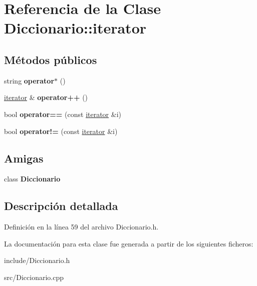 \hypertarget{classDiccionario_1_1iterator}{}\section{Referencia de la Clase Diccionario\+:\+:iterator}
\label{classDiccionario_1_1iterator}
\subsection*{Métodos públicos}
\begin{DoxyCompactItemize}
\item 
string {\bfseries operator$\ast$} ()\hypertarget{classDiccionario_1_1iterator_aa03a8aa59bb2b36d4b6d6540afc18deb}{}\label{classDiccionario_1_1iterator_aa03a8aa59bb2b36d4b6d6540afc18deb}

\item 
\hyperlink{classDiccionario_1_1iterator}{iterator} \& {\bfseries operator++} ()\hypertarget{classDiccionario_1_1iterator_a94988ab91331a66258a208276730bb9c}{}\label{classDiccionario_1_1iterator_a94988ab91331a66258a208276730bb9c}

\item 
bool {\bfseries operator==} (const \hyperlink{classDiccionario_1_1iterator}{iterator} \&i)\hypertarget{classDiccionario_1_1iterator_a6ab38d0620a196200714ee04291dea55}{}\label{classDiccionario_1_1iterator_a6ab38d0620a196200714ee04291dea55}

\item 
bool {\bfseries operator!=} (const \hyperlink{classDiccionario_1_1iterator}{iterator} \&i)\hypertarget{classDiccionario_1_1iterator_a5d51cafd201ab15390e991c6aed327ee}{}\label{classDiccionario_1_1iterator_a5d51cafd201ab15390e991c6aed327ee}

\end{DoxyCompactItemize}
\subsection*{Amigas}
\begin{DoxyCompactItemize}
\item 
class {\bfseries Diccionario}\hypertarget{classDiccionario_1_1iterator_ad36be158dde0129b4e0d03d0e454a26b}{}\label{classDiccionario_1_1iterator_ad36be158dde0129b4e0d03d0e454a26b}

\end{DoxyCompactItemize}


\subsection{Descripción detallada}


Definición en la línea 59 del archivo Diccionario.\+h.



La documentación para esta clase fue generada a partir de los siguientes ficheros\+:\begin{DoxyCompactItemize}
\item 
include/Diccionario.\+h\item 
src/Diccionario.\+cpp\end{DoxyCompactItemize}
